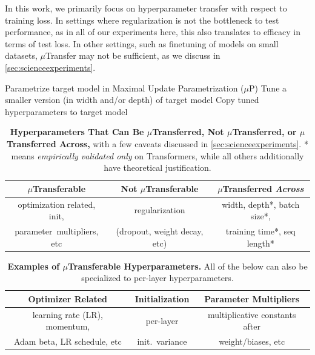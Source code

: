 \documentclass{article}
\theoremstyle{definition}
\begin{document}
In this work, we primarily focus on hyperparameter transfer with respect to training loss.
In settings where regularization is not the bottleneck to test performance, as in all of our experiments here, this also translates to efficacy in terms of test loss.
In other settings, such as finetuning of models on small datasets, $\mu$Transfer may not be sufficient, as we discuss in \cref{sec:scienceexperiments}.

\begin{algorithm}[t]
  \caption{Tuning a Large Target Model via $\mu$Transfer}
  \begin{algorithmic}[1]
  \State Parametrize target model in Maximal Update Parametrization ($\mu$P)
  \State Tune a smaller version (in width and/or depth) of target model
  \State Copy tuned hyperparameters to target model
  \end{algorithmic}
  \label{alg:hptransfer}
  \end{algorithm}

\begin{table}[t]
    \centering
    \caption[Hyperparameters That Can Be $\mu$Transferred, Not $\mu$Transferred, or $\mu$Transferred Across]{\textbf{Hyperparameters That Can Be $\mu$Transferred, Not $\mu$Transferred, or $\mu$Transferred Across,}
    with a few caveats discussed in \cref{sec:scienceexperiments}.
    * means \emph{empirically validated only} on Transformers, while all others additionally have theoretical justification.}
    \begin{tabular}{ccc}
    \toprule
    $\mu$Transferable                & Not $\mu$Transferable              & $\mu$Transferred \emph{Across}     \\
    \midrule
    optimization related, init,           & regularization                & width, depth*, batch size*,   \\
    parameter\ multipliers, etc    & (dropout, weight decay, etc)  & training time*, seq length*           \\
    \bottomrule                                       
    \end{tabular}
    \label{tab:whichtransfer}
\end{table}

\begin{table}[t]
    \centering
    \caption[Examples of $\mu$Transferable Hyperparameters]{\textbf{Examples of $\mu$Transferable Hyperparameters.}
    All of the below can also be specialized to per-layer hyperparameters.}
    \begin{tabular}{ccc}
    \toprule
    Optimizer Related                   & Initialization    & {Parameter Multipliers}            \\
    \midrule
    learning rate (LR), momentum,       & per-layer         & multiplicative constants after       \\
    Adam beta, LR schedule, etc              & init.\ variance    & weight/biases, etc  \\
    \bottomrule                                       
    \end{tabular}
    \label{tab:transferables}
\end{table}
\end{document}
